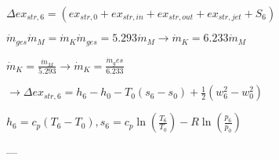 \( \Delta ex_{str,6} = (ex_{str,0} + ex_{str,in} + ex_{str,out} + ex_{str,jet} + S_6) \)  

\( \dot{m}_{ges} \dot{m}_M = \dot{m}_K \dot{m}_{ges} = 5.293 \dot{m}_M \rightarrow \dot{m}_K = 6.233 \dot{m}_M \)  

\( \dot{m}_K = \frac{\dot{m}_M}{5.293} \rightarrow \dot{m}_K = \frac{\dot{m}_ges}{6.233} \)  

\( \rightarrow \Delta ex_{str,6} = h_6 - h_0 - T_0 (s_6 - s_0) + \frac{1}{2} (w_6^2 - w_0^2) \)  

\( h_6 = c_p (T_6 - T_0), s_6 = c_p \ln \left( \frac{T_6}{T_0} \right) - R \ln \left( \frac{p_6}{p_0} \right) \)  

---